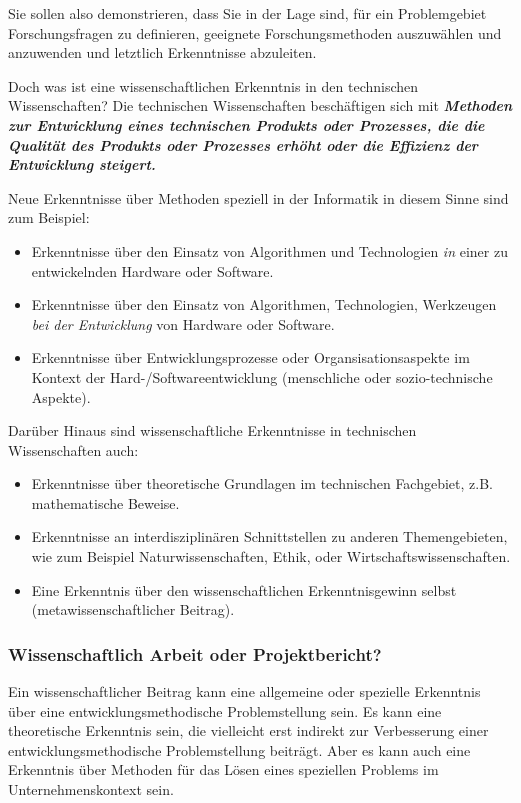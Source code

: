 Sie sollen also demonstrieren, dass Sie in der Lage sind, für ein Problemgebiet Forschungsfragen zu definieren, geeignete Forschungsmethoden auszuwählen und anzuwenden und letztlich Erkenntnisse abzuleiten.


Doch was ist eine wissenschaftlichen Erkenntnis in den technischen Wissenschaften? Die technischen Wissenschaften beschäftigen sich mit \textbf{\textit{Methoden zur Entwicklung eines technischen Produkts oder Prozesses, die die Qualität des Produkts oder Prozesses erhöht oder die Effizienz der Entwicklung steigert.} }

Neue Erkenntnisse über Methoden speziell in der Informatik in diesem Sinne sind zum Beispiel:

\begin{itemize}
    \item Erkenntnisse über den Einsatz von Algorithmen und Technologien \textit{in} einer zu entwickelnden Hardware oder Software.
    \item Erkenntnisse über den Einsatz von Algorithmen, Technologien, Werkzeugen \textit{bei der Entwicklung} von Hardware oder Software.
    \item Erkenntnisse über Entwicklungsprozesse oder Organsisationsaspekte im Kontext der Hard-/Softwareentwicklung (menschliche oder sozio-technische Aspekte).
\end{itemize}


Darüber Hinaus sind wissenschaftliche Erkenntnisse in technischen Wissenschaften auch:

\begin{itemize}
    \item Erkenntnisse über theoretische Grundlagen im technischen Fachgebiet, z.B. mathematische Beweise.
    \item Erkenntnisse an interdisziplinären Schnittstellen zu anderen Themengebieten, wie zum Beispiel Naturwissenschaften, Ethik, oder Wirtschaftswissenschaften.
    \item Eine Erkenntnis über den wissenschaftlichen Erkenntnisgewinn selbst (metawissenschaftlicher Beitrag).
\end{itemize}



\subsubsection{Wissenschaftlich Arbeit oder Projektbericht?}

Ein wissenschaftlicher Beitrag kann eine allgemeine oder spezielle Erkenntnis über eine entwicklungsmethodische Problemstellung sein. Es kann eine theoretische Erkenntnis sein, die vielleicht erst indirekt zur Verbesserung einer entwicklungsmethodische Problemstellung beiträgt. Aber es kann auch eine Erkenntnis über Methoden für das Lösen eines speziellen Problems im Unternehmenskontext sein.

